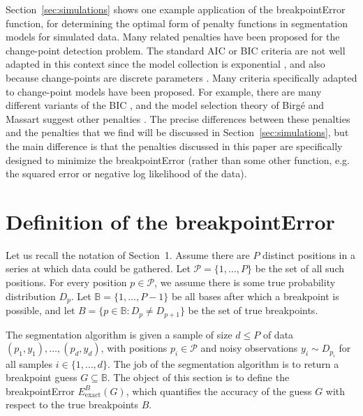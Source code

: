 \documentclass{jsfds} %
\begin{document}
Section~\ref{sec:simulations} shows one example application of the
breakpointError function, for determining the optimal form of penalty
functions in segmentation models for simulated data. Many related
penalties have been proposed for the change-point detection
problem. The standard AIC or BIC criteria are not well adapted in this
context since the model collection is exponential
\citep{BM04,BIC,Akaike73,BGH09}, and also because change-points are
discrete parameters \citep{mBIC}.  Many criteria specifically adapted
to change-point models have been proposed.  For example, there are
many different variants of the BIC \citep{Yao88,Lee95,mBIC}, and the
model selection theory of Birg\'e and Massart suggest other penalties
\citep{lavielle2005,lebarbier,BM04,calibration}. The precise
differences between these penalties and the penalties that we find
will be discussed in Section~\ref{sec:simulations}, but the main
difference is that the penalties discussed in this paper are
specifically designed to minimize the breakpointError (rather than
some other function, e.g. the squared error or negative log likelihood
of the data).


\newpage

\section{Definition of the breakpointError}
\label{sec:definition}

Let us recall the notation of Section~1. Assume there are $P$ distinct
positions in a series at which data could be gathered. Let $\mathcal
P= \{1,\dots,P\}$ be the set of all such positions. For every position
$p\in\mathcal P$, we assume there is some true probability
distribution $D_p$. Let $\mathbb B=\{1,\dots,P-1\}$ be all bases after
which a breakpoint is possible, and let $B = \{p\in \mathbb B : D_p
\neq D_{p+1}\}$ be the set of true breakpoints.

The segmentation algorithm is given a sample of size $d \leq P$ of
data $(p_1, y_1), \dots, (p_d, y_d)$, with positions $p_i\in\mathcal
P$ and noisy observations $y_i\sim D_{p_i}$ for all samples $i\in\{1,
\dots, d\}$. The job of the segmentation algorithm is to return a
breakpoint guess $G\subseteq \mathbb B$. The object of this section is to
define the breakpointError $E^B_{\text{exact}}(G)$, which quantifies
the accuracy of the guess $G$ with respect to the true breakpoints
$B$.
\end{document}
